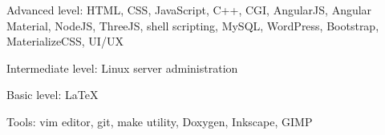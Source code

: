 \cventry{}
    {Advanced level:}
    {}
    {HTML, CSS, JavaScript, C++, CGI, AngularJS, Angular Material, NodeJS, ThreeJS, shell scripting, MySQL, WordPress, Bootstrap, MaterializeCSS, UI/UX}
    {}
    {}

\cventry{}
    {Intermediate level:}
    {}
    {Linux server administration}
    {}
    {}

\cventry{}
    {Basic level:}
    {}
    {\LaTeX}
    {}
    {}

\cventry{}
    {Tools:}
    {}
    {vim editor, git, make utility, Doxygen, Inkscape, GIMP}
    {}
    {}
